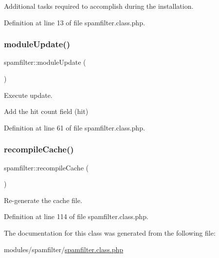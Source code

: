 Additional tasks required to accomplish during the installation. 



Definition at line 13 of file spamfilter.\+class.\+php.

\hypertarget{classspamfilter_ae3980ae505347671cd20e5de25448772}{}\label{classspamfilter_ae3980ae505347671cd20e5de25448772} 
\subsubsection{\texorpdfstring{module\+Update()}{moduleUpdate()}}
{\footnotesize\ttfamily spamfilter\+::module\+Update (\begin{DoxyParamCaption}{ }\end{DoxyParamCaption})}



Execute update. 

Add the hit count field (hit)

Definition at line 61 of file spamfilter.\+class.\+php.

\hypertarget{classspamfilter_af660e435ce957c41e79a555110875960}{}\label{classspamfilter_af660e435ce957c41e79a555110875960} 
\subsubsection{\texorpdfstring{recompile\+Cache()}{recompileCache()}}
{\footnotesize\ttfamily spamfilter\+::recompile\+Cache (\begin{DoxyParamCaption}{ }\end{DoxyParamCaption})}



Re-\/generate the cache file. 



Definition at line 114 of file spamfilter.\+class.\+php.



The documentation for this class was generated from the following file\+:\begin{DoxyCompactItemize}
\item 
modules/spamfilter/\hyperlink{spamfilter_8class_8php}{spamfilter.\+class.\+php}\end{DoxyCompactItemize}
